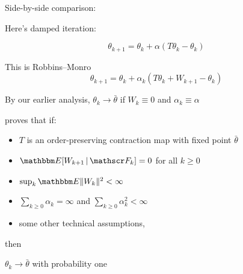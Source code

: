\documentclass[xcolor=dvipsnames]{beamer}  %
\renewcommand{\geq}{\geqslant}
\newcommand{\1}{\mathbbm 1}
\newcommand{\given}{\, | \,}
\newcommand{\EE}{\mathbbm E}
\newcommand{\fF}{\mathscr F}
\begin{document}
\begin{frame}
    
    Side-by-side comparison:

    \vspace{1em}

    Here's damped iteration:

    \begin{equation*}
        \theta_{k+1} = \theta_k + \alpha (T \theta_k - \theta_k)
    \end{equation*}

    \vspace{1em}
    \vspace{1em}

    This is Robbins--Monro 
    \begin{equation*}
        \theta_{k+1} 
        = \theta_k + \alpha_k ( T \theta_k + W_{k+1} - \theta_k )
    \end{equation*}

\end{frame}


\begin{frame}
    
    By our earlier analysis, $\theta_k \to \bar \theta$ if $W_k \equiv 0$ and
    $\alpha_k \equiv \alpha$

    \vspace{0.5em}
    \cite{tsitsiklis1994asynchronous} proves that if:
    \begin{itemize}
        \item $T$ is an order-preserving contraction map with fixed
            point $\bar \theta$
            \vspace{0.5em}
        \item $\EE [W_{k+1} \given \fF_k] = 0$ for all $k \geq 0$
            \vspace{0.5em}
        \item $\sup_k \EE \| W_k \|^2 < \infty$ 
            \vspace{0.5em}
        \item $\sum_{k \geq 0} \alpha_k = \infty$ and $\sum_{k \geq 0} \alpha_k^2 < \infty$
            \vspace{0.5em}
        \item some other technical assumptions,
    \end{itemize}
    then 
    \begin{center}
        $\theta_k \to \bar \theta$ with probability one
    \end{center}

\end{frame}
\end{document}
